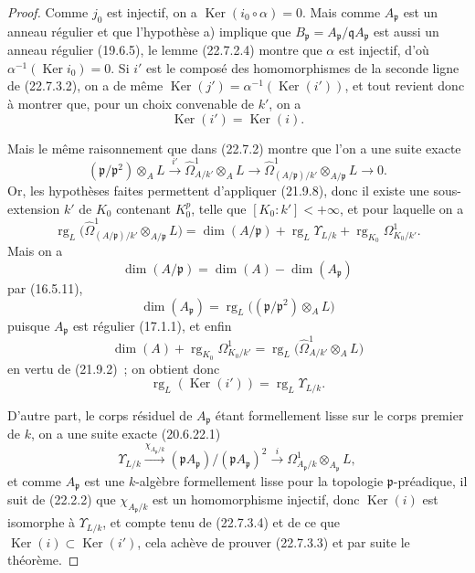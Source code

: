 \begin{proof}
Comme $j_0$ est injectif, on a $\operatorname{Ker}(i_0\circ\alpha)=0$. Mais comme
$A_{\mathfrak p}$ est un anneau régulier et que l'hypothèse a) implique que
$B_{\mathfrak p}=A_{\mathfrak p}/\mathfrak qA_{\mathfrak p}$ est aussi un
anneau régulier (19.6.5), le lemme (22.7.2.4) montre que $\alpha$ est injectif,
d'où $\alpha^{-1}(\operatorname{Ker} i_0)=0$. Si $i'$ est le composé des homomorphismes de la
seconde ligne de (22.7.3.2), on a de même
$\operatorname{Ker}(j')=\alpha^{-1}(\operatorname{Ker}(i'))$, et tout revient donc à montrer que, pour un
choix convenable de $k'$, on a
\begin{equation}
\label{0.22.7.3.3-fr}
  \operatorname{Ker}(i')=\operatorname{Ker}(i).
  \tag{22.7.3.3}
\end{equation}

Mais le même raisonnement que dans (22.7.2) montre que l'on a une suite exacte
\[
  (\mathfrak p/\mathfrak p^2)\otimes_AL\xrightarrow{i'}
  \widehat\Omega^1_{A/k'}\otimes_AL\longrightarrow
  \widehat\Omega^1_{(A/\mathfrak p)/k'}\otimes_{A/\mathfrak p}L
  \longrightarrow0.
\]
Or, les hypothèses faites permettent d'appliquer (21.9.8), donc il existe une
sous-extension $k'$ de $K_0$ contenant $K_0^p$, telle que
$[K_0:k']<+\infty$, et pour laquelle on a
\[
  \operatorname{rg}_L\bigl(\widehat\Omega^1_{(A/\mathfrak p)/k'}
  \otimes_{A/\mathfrak p}L\bigr)
  =\dim(A/\mathfrak p)+\operatorname{rg}_L\Upsilon_{L/k}
  +\operatorname{rg}_{K_0}\Omega^1_{K_0/k'}.
\]
Mais on a
\[
  \dim(A/\mathfrak p)=\dim(A)-\dim(A_{\mathfrak p})
\]
par (16.5.11),
\[
  \dim(A_{\mathfrak p})
  =\operatorname{rg}_L\bigl((\mathfrak p/\mathfrak p^2)\otimes_AL\bigr)
\]
puisque $A_{\mathfrak p}$ est régulier (17.1.1), et enfin
\[
  \dim(A)+\operatorname{rg}_{K_0}\Omega^1_{K_0/k'}
  =\operatorname{rg}_L\bigl(\widehat\Omega^1_{A/k'}\otimes_AL\bigr)
\]
en vertu de (21.9.2)~; on obtient donc
\begin{equation}
\label{0.22.7.3.4-fr}
  \operatorname{rg}_L(\operatorname{Ker}(i'))=\operatorname{rg}_L\Upsilon_{L/k}.
  \tag{22.7.3.4}
\end{equation}

D'autre part, le corps résiduel de $A_{\mathfrak p}$ étant formellement lisse
sur le corps premier de $k$, on a une suite exacte (20.6.22.1)
\[
  \Upsilon_{L/k}\xrightarrow{\chi_{A_{\mathfrak p}/k}}
  (\mathfrak pA_{\mathfrak p})/(\mathfrak pA_{\mathfrak p})^2
  \xrightarrow{i}\Omega^1_{A_{\mathfrak p}/k}
  \otimes_{A_{\mathfrak p}}L,
\]
et comme $A_{\mathfrak p}$ est une $k$-algèbre formellement lisse pour la
topologie $\mathfrak p$-préadique, il suit de (22.2.2) que
$\chi_{A_{\mathfrak p}/k}$ est un homomorphisme injectif, donc $\operatorname{Ker}(i)$ est
isomorphe à $\Upsilon_{L/k}$, et compte tenu de (22.7.3.4) et de ce que
$\operatorname{Ker}(i)\subset\operatorname{Ker}(i')$, cela achève de prouver (22.7.3.3) et par suite le
théorème.
\end{proof}

